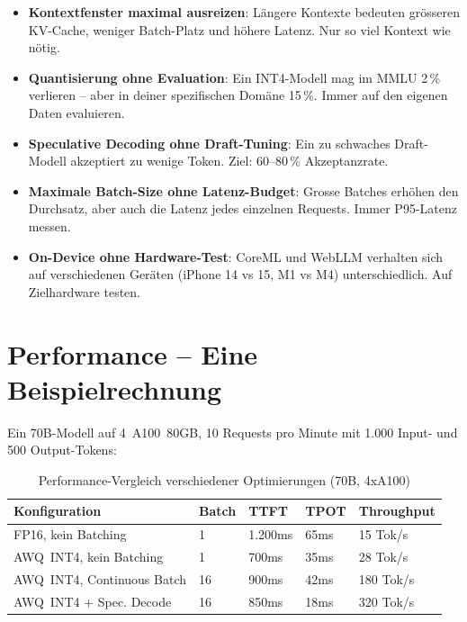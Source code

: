 \begin{itemize}[leftmargin=*]
    \item \textbf{Kontextfenster maximal ausreizen}: Längere Kontexte bedeuten grösseren KV-Cache, weniger Batch-Platz und höhere Latenz. Nur so viel Kontext wie nötig.
    \item \textbf{Quantisierung ohne Evaluation}: Ein INT4-Modell mag im MMLU 2\,\% verlieren -- aber in deiner spezifischen Domäne 15\,\%. Immer auf den eigenen Daten evaluieren.
    \item \textbf{Speculative Decoding ohne Draft-Tuning}: Ein zu schwaches Draft-Modell akzeptiert zu wenige Token. Ziel: 60--80\,\% Akzeptanzrate.
    \item \textbf{Maximale Batch-Size ohne Latenz-Budget}: Grosse Batches erhöhen den Durchsatz, aber auch die Latenz jedes einzelnen Requests. Immer P95-Latenz messen.
    \item \textbf{On-Device ohne Hardware-Test}: CoreML und WebLLM verhalten sich auf verschiedenen Geräten (iPhone 14 vs 15, M1 vs M4) unterschiedlich. Auf Zielhardware testen.
\end{itemize}

\section{Performance -- Eine Beispielrechnung}

Ein 70B-Modell auf 4~A100~80GB, 10 Requests pro Minute mit 1.000 Input- und 500 Output-Tokens:

\begin{table}[H]
\centering
\begin{tabularx}{\linewidth}{lXXXX}
\toprule
\textbf{Konfiguration} & \textbf{Batch} & \textbf{TTFT} & \textbf{TPOT} & \textbf{Throughput} \\
\midrule
FP16, kein Batching & 1 & 1.200ms & 65ms & 15 Tok/s \\
AWQ~INT4, kein Batching & 1 & 700ms & 35ms & 28 Tok/s \\
AWQ~INT4, Continuous Batch & 16 & 900ms & 42ms & 180 Tok/s \\
AWQ~INT4 + Spec. Decode & 16 & 850ms & 18ms & 320 Tok/s \\
\bottomrule
\end{tabularx}
\caption{Performance-Vergleich verschiedener Optimierungen (70B, 4xA100)}
\label{tab:perf-comparison}
\end{table}

